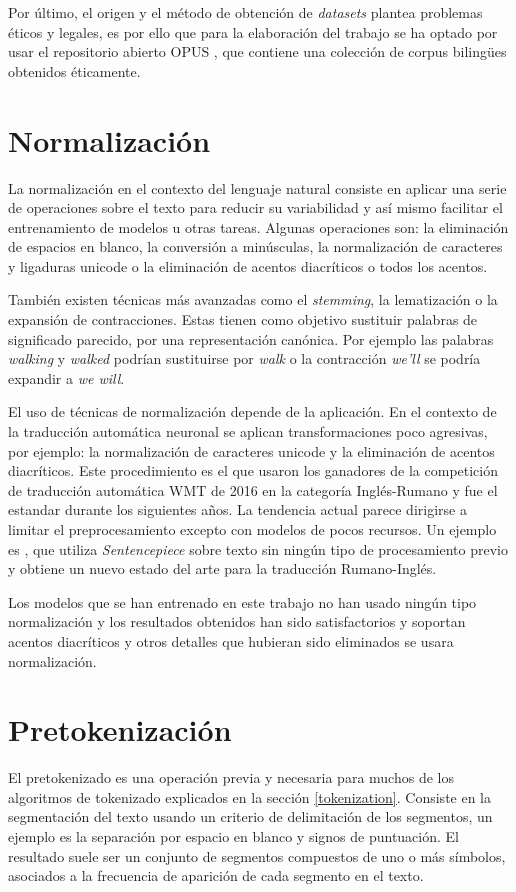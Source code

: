 Por último, el origen y el método de obtención de \textit{datasets} plantea problemas éticos y legales, es por ello que para la elaboración del trabajo se ha optado por usar el repositorio abierto OPUS \cite{CORPUS}, que contiene una colección de corpus biling{\"u}es obtenidos éticamente.

\section{Normalización}
La normalización en el contexto del lenguaje natural consiste en aplicar una serie de operaciones sobre el texto para reducir su variabilidad y así mismo facilitar el entrenamiento de modelos u otras tareas. Algunas operaciones son: la eliminación de espacios en blanco, la conversión a minúsculas, la normalización de caracteres y ligaduras unicode o la eliminación de acentos diacríticos o todos los acentos.

También existen técnicas más avanzadas como el \textit{stemming}, la lematización o la expansión de contracciones. Estas tienen como objetivo sustituir palabras de significado parecido, por una representación canónica. Por ejemplo las palabras \textit{walking} y \textit{walked} podrían sustituirse por \textit{walk} o la contracción \textit{we'll} se podría expandir a \textit{we will}.

El uso de técnicas de normalización depende de la aplicación. En el contexto de la traducción automática neuronal se aplican transformaciones poco agresivas, por ejemplo: la normalización de caracteres unicode y la eliminación de acentos diacríticos.
Este procedimiento es el que usaron los ganadores de la competición de traducción automática WMT de 2016 en la categoría Inglés-Rumano \cite{Sennrich2016Jun} y fue el estandar durante los siguientes años. La tendencia actual parece dirigirse a limitar el preprocesamiento excepto con modelos de pocos recursos. Un ejemplo es \cite{Liu2020Jan}, que utiliza \textit{Sentencepiece} sobre texto sin ningún tipo de procesamiento previo y obtiene un nuevo estado del arte para la traducción Rumano-Inglés.

Los modelos que se han entrenado en este trabajo no han usado ningún tipo normalización y los resultados obtenidos han sido satisfactorios y soportan acentos diacríticos y otros detalles que hubieran sido eliminados se usara normalización.

\section{Pretokenización}
El pretokenizado es una operación previa y necesaria para muchos de los algoritmos de tokenizado explicados en la sección \ref{tokenization}. Consiste en la segmentación del texto usando un criterio de delimitación de los segmentos, un ejemplo es la separación por espacio en blanco y signos de puntuación.
El resultado suele ser un conjunto de segmentos compuestos de uno o más símbolos, asociados a la frecuencia de aparición de cada segmento en el texto. 

